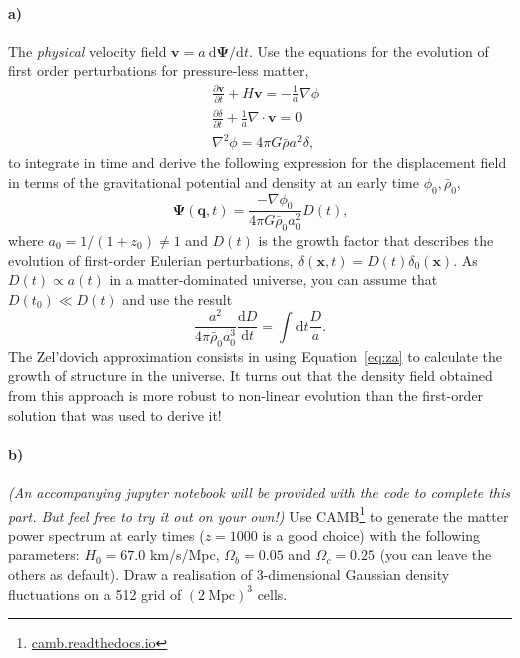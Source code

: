 \documentclass[12pt]{article}
\renewcommand\diff{\mathrm{d}}
\begin{document}
\paragraph{a)} The \emph{physical} velocity field $\mathbf{v} = a\: \diff\mathbf{\Psi}/\diff t$. Use
the equations for the evolution of first order perturbations for pressure-less
matter,
\begin{equation}
\begin{aligned}
    &\frac{\partial \mathbf{v}}{\partial t} + H \mathbf{v} = - \frac{1}{a} \nabla \phi \\
    &\frac{\partial \delta}{\partial t} + \frac{1}{a} \nabla \cdot \mathbf{v} = 0\\
    &\nabla^2 \phi = 4 \pi G \bar{\rho} a^2 \delta \text{,}
\end{aligned}
\label{eq:first-order}
\end{equation}
to integrate in time and derive the following expression for the displacement
field in terms of the gravitational potential and density at an early time
$\phi_0, \bar{\rho}_0$,
\begin{equation}
    \mathbf{\Psi}(\mathbf{q}, t) = \frac{-\nabla \phi_0}{4 \pi G \bar{\rho}_0 a_0^2} D(t)
    \text{,}
\label{eq:za}
\end{equation}
where $a_0 = 1 / (1 + z_0) \neq 1$ and $D(t)$ is the growth factor that describes the evolution of first-order
Eulerian perturbations, $\delta(\mathbf{x}, t) = D(t) \delta_0(\mathbf{x})$. As
$D(t) \propto a(t)$ in a matter-dominated universe, you can assume that $D(t_0)
\ll D(t)$ and use the result
\begin{equation}
    \frac{a^2}{4 \pi \bar{\rho}_0 a_0^3} \frac{\diff D}{\diff t} = \int \diff t \frac{D}{a} \text{.}
\end{equation}
The Zel'dovich approximation consists in using Equation~\ref{eq:za} to calculate
the growth of structure in the universe. It turns out that the density field
obtained from this approach is more robust to non-linear evolution than the
first-order solution that was used to derive it!

\paragraph{b)} \emph{(An accompanying jupyter notebook will be provided with the
code to complete this part. But feel free to try it out on your own!)} Use
CAMB\footnote{\url{camb.readthedocs.io}} to generate the matter power spectrum
at early times ($z=1000$ is a good choice) with the following parameters: $H_0 =
67.0$ km/s/Mpc, $\Omega_b = 0.05$ and $\Omega_c = 0.25$ (you can leave the
others as default). Draw a realisation of 3-dimensional Gaussian density
fluctuations on a 512 grid of $(2\:\mathrm{Mpc})^3$ cells.
\end{document}
